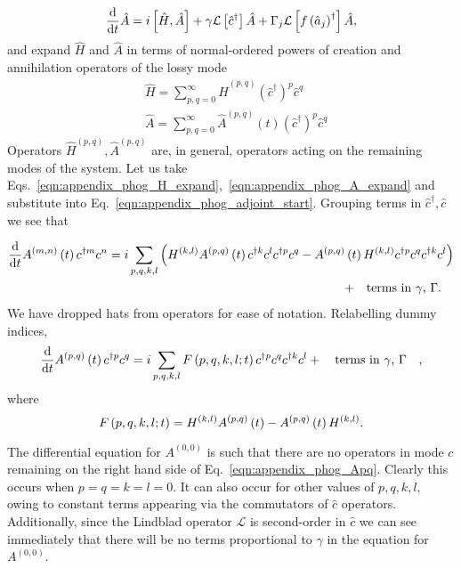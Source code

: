 \begin{equation}\label{eqn:appendix_phog_adjoint_start}
\frac{\mathrm{d}}{\mathrm{d}t} \hat{A} = i \left[ \hat{H}, \hat{A} \right] + \gamma \mathcal{L}\left[\hat{c}^\dagger \right] \hat{A} + \Gamma_j \mathcal{L} \left[ f\left(\hat{a}_j\right)^\dagger\right] \hat{A},
\end{equation}
and expand $\hat{H}$ and $\hat{A}$ in terms of normal-ordered powers of creation and annihilation operators of the lossy mode
\begin{align}
&\hat{H} = \sum_{p, q = 0}^{\infty} \hat{H}^{\left(p, q\right)} \left(\hat{c}^\dagger\right)^p \hat{c}^q \label{eqn:appendix_phog_H_expand}  \\
%
&\hat{A} = \sum_{p, q = 0}^{\infty} \hat{A}^{\left(p, q\right)}\left(t\right) \left(\hat{c}^\dagger \right)^p \hat{c}^q \label{eqn:appendix_phog_A_expand}
\end{align}
Operators $\hat{H}^{\left(p, q\right)}, \hat{A}^{\left(p, q\right)}$ are, in general, operators acting on the remaining modes of the system. Let us take Eqs.~\ref{eqn:appendix_phog_H_expand},~\ref{eqn:appendix_phog_A_expand} and substitute into Eq.~\ref{eqn:appendix_phog_adjoint_start}. Grouping terms in $\hat{c}^\dagger, \hat{c}$ we see that 

\begin{align}
\ddt A^{\left(m, n\right)}\left(t\right) c^{\dagger m} c^n = i \sum_{p, q, k, l} \left(H^{\left(k, l\right)} A^{\left(p, q\right)}\left(t\right) c^{\dagger k} c^{l} c^{\dagger p} c^q - A^{\left(p, q\right)}\left(t\right) H^{\left(k, l\right)} c^{\dagger p} c^q c^{\dagger k} c^l\right)& \notag \\
%
+ \qq{terms in $\gamma$, $\Gamma$.}&
\end{align}
We have dropped hats from operators for ease of notation. Relabelling dummy indices,
\begin{equation}\label{eqn:appendix_phog_Apq}
\ddt A^{\left(p, q\right)}\left(t\right) c^{\dagger p} c^q = i \sum_{p, q, k, l} F\left(p, q, k, l; t\right) c^{\dagger p} c^{q} c^{\dagger k} c^l + \qq{terms in $\gamma$, $\Gamma$},
\end{equation}
where
\begin{equation}
F\left(p, q, k, l; t\right) = H^{\left(k, l\right)} A^{\left(p, q\right)}\left(t\right) - A^{\left(p, q\right)}\left(t\right) H^{\left(k, l\right)}. \notag
\end{equation}

\noindent The differential equation for $A^{\left(0, 0\right)}$ is such that there are no operators in mode $c$ remaining on the right hand side of Eq.~\ref{eqn:appendix_phog_Apq}. Clearly this occurs when $p=q=k=l=0$. It can also occur for other values of $p, q, k, l$, owing to constant terms appearing via the commutators of $\hat{c}$ operators. Additionally, since the Lindblad operator $\mathcal{L}$ is second-order in $\hat{c}$ we can see immediately that there will be no terms proportional to $\gamma$ in the equation for $A^{\left(0, 0\right)}$. 

